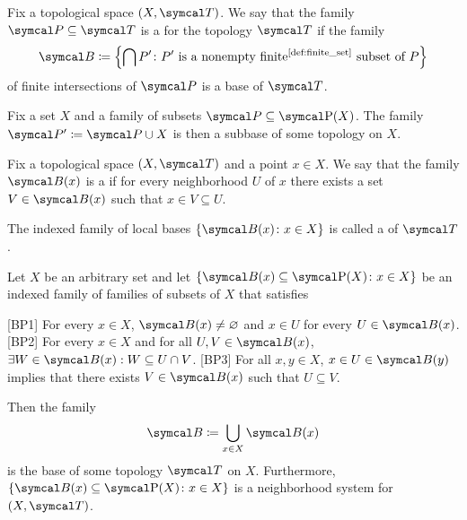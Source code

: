\begin{definition}\label{def:topological_subbase}\cite[12]{Engelking1989}
  Fix a topological space \( (X, \Cal{T}) \). We say that the family \( \Cal{P} \subseteq \Cal{T} \) is a  for the topology \( \Cal{T} \) if the family
  \begin{equation*}
    \Cal{B} \coloneqq \left\{ \bigcap P' \colon P' \text{ is a nonempty finite\Tinyref{def:finite_set} subset of } P \right\}
  \end{equation*}
  of finite intersections of \( \Cal{P} \) is a base of \( \Cal{T} \).
\end{definition}

\begin{proposition}
  Fix a set \( X \) and a family of subsets \( \Cal{P} \subseteq \Power(X) \). The family \( \Cal{P}' \coloneqq \Cal{P} \cup X \) is then a subbase of some topology on \( X \).
\end{proposition}

\begin{definition}\label{def:topological_local_base}\cite[12]{Engelking1989}
  Fix a topological space \( (X, \Cal{T}) \) and a point \( x \in X \). We say that the family \( \Cal{B}(x) \) is a  if for every neighborhood \( U \) of \( x \) there exists a set \( V \in \Cal{B}(x) \) such that \( x \in V \subseteq U \).

  The indexed family of local bases \( \{ \Cal{B}(x) \colon x \in X \} \) is called a  of \( \Cal{T} \).
\end{definition}

\begin{proposition}\label{thm:topological_local_base_axioms}\cite[13]{Engelking1989}
  Let \( X \) be an arbitrary set and let \( \{ \Cal{B}(x) \subseteq \Power(X) \colon x \in X \} \) be an indexed family of families of subsets of \( X \) that satisfies
  \begin{description}
    [BP1] For every \( x \in X \), \( \Cal{B}(x) \neq \varnothing \) and \( x \in U \) for every \( U \in \Cal{B}(x) \).
    [BP2] For every \( x \in X \) and for all \( U, V \in \Cal{B}(x) \), \( \exists W \in \Cal{B}(x): W \subseteq U \cap V \).
    [BP3] For all \( x, y \in X \), \( x \in U \in \Cal{B}(y) \) implies that there exists \( V \in \Cal{B}(x) \) such that \( U \subseteq V \).
  \end{description}

  Then the family
  \begin{equation*}
    \Cal{B} \coloneqq \bigcup_{x \in X} \Cal{B}(x)
  \end{equation*}
  is the base of some topology \( \Cal{T} \) on \( X \). Furthermore, \( \{ \Cal{B}(x) \subseteq \Power(X) \colon x \in X \} \) is a neighborhood system for \( (X, \Cal{T}) \).
\end{proposition}

